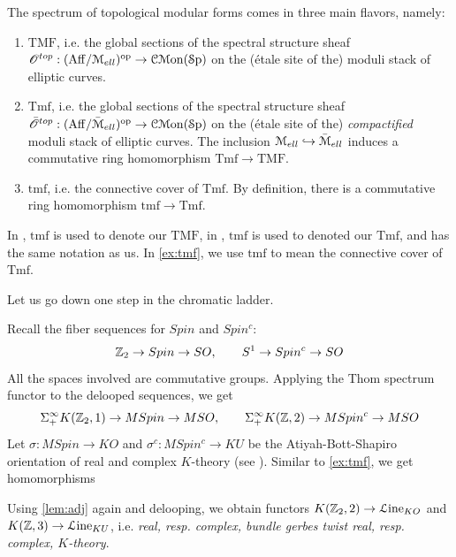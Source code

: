\documentclass[10pt]{amsart}
\begin{document}
\begin{remark}\label{rmk:names}The spectrum of topological modular forms comes in three main flavors, namely:
\begin{enumerate}
	\item $\mathrm{TMF}$, i.e. the global sections of the spectral structure sheaf $\mathscr{O}^{top}:(\mathrm{Aff}/\mathcal{M}_{ell})^{\mathrm{op}}\to\mathcal{C}\mathcal{M}\mathrm{on}(\mathcal{S}\mathrm{p})$ on the (\' etale site of the) moduli stack of elliptic curves.
	\item $\mathrm{Tmf}$, i.e. the global sections of the spectral structure sheaf $\bar{\mathscr{O}}^{top}:(\mathrm{Aff}/\bar{\mathcal{M}}_{ell})^{\mathrm{op}}\to\mathcal{C}\mathcal{M}\mathrm{on}(\mathcal{S}\mathrm{p})$ on the (\' etale site of the) \emph{compactified} moduli stack of elliptic curves. The inclusion $\mathcal{M}_{ell}\hookrightarrow\bar{\mathcal{M}}_{ell}$ induces a commutative ring homomorphism $\mathrm{Tmf}\to\mathrm{TMF}$.
	\item $\mathrm{tmf}$, i.e. the connective cover of $\mathrm{Tmf}$. By definition, there is a commutative ring homomorphism $\mathrm{tmf}\to\mathrm{Tmf}$. 
\end{enumerate}In \cite{ando2010multiplicative}, $\mathrm{tmf}$ is used to denote our $\mathrm{TMF}$, in \cite{goerss2009topologicalmodularformsaftern}, $\mathrm{tmf}$ is used to denoted our $\mathrm{Tmf}$, and \cite{douglas2014topological} has the same notation as us. In \cref{ex:tmf}, we use $\mathrm{tmf}$ to mean the connective cover of $\mathrm{Tmf}$. 
\end{remark}
Let us go down one step in the chromatic ladder. 
\begin{example}\label{ex:ktheory}
	Recall the fiber sequences for $Spin$ and $Spin^c$: \[\mathbb{Z}_2\to Spin\to SO,\qquad S^1\to Spin^c\to SO\] All the spaces involved are commutative groups. Applying the Thom spectrum functor to the delooped sequences, we get\[\Sigma^\infty_+K(\mathbb{Z}_2,1)\to MSpin\to MSO,\qquad\Sigma^\infty_+K(\mathbb{Z},2)\to MSpin^c\to MSO \]
	Let $\sigma:MSpin\to KO$ and $\sigma^c:MSpin^c\to KU$ be the Atiyah-Bott-Shapiro orientation of real and complex $K$-theory (see \cite{atiyahbottshapiro1964clifford}).
	Similar to \cref{ex:tmf}, we get homomorphisms 
	\begin{center}
	\end{center}
	Using \cref{lem:adj} again and delooping, we obtain functors $K(\mathbb{Z}_2,2)\to\mathcal{L}\mathrm{ine}_{KO}$ and $K(\mathbb{Z},3)\to \mathcal{L}\mathrm{ine}_{KU}$, i.e. \emph{real, resp. complex, bundle gerbes twist real, resp. complex, $K$-theory}. 
\end{example}
\end{document}
